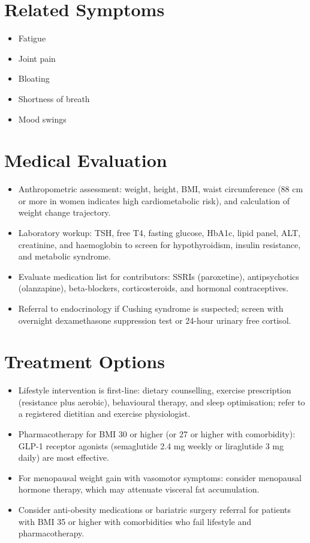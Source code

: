 \section*{Related Symptoms}
\begin{itemize}
  \item Fatigue
  \item Joint pain
  \item Bloating
  \item Shortness of breath
  \item Mood swings
\end{itemize}


\section*{Medical Evaluation}
\begin{itemize}
  \item Anthropometric assessment: weight, height, BMI, waist circumference (88 cm or more in women indicates high cardiometabolic risk), and calculation of weight change trajectory.
  \item Laboratory workup: TSH, free T4, fasting glucose, HbA1c, lipid panel, ALT, creatinine, and haemoglobin to screen for hypothyroidism, insulin resistance, and metabolic syndrome.
  \item Evaluate medication list for contributors: SSRIs (paroxetine), antipsychotics (olanzapine), beta-blockers, corticosteroids, and hormonal contraceptives.
  \item Referral to endocrinology if Cushing syndrome is suspected; screen with overnight dexamethasone suppression test or 24-hour urinary free cortisol.
\end{itemize}

\section*{Treatment Options}
\begin{itemize}
  \item Lifestyle intervention is first-line: dietary counselling, exercise prescription (resistance plus aerobic), behavioural therapy, and sleep optimisation; refer to a registered dietitian and exercise physiologist.
  \item Pharmacotherapy for BMI 30 or higher (or 27 or higher with comorbidity): GLP-1 receptor agonists (semaglutide 2.4 mg weekly or liraglutide 3 mg daily) are most effective.
  \item For menopausal weight gain with vasomotor symptoms: consider menopausal hormone therapy, which may attenuate visceral fat accumulation.
  \item Consider anti-obesity medications or bariatric surgery referral for patients with BMI 35 or higher with comorbidities who fail lifestyle and pharmacotherapy.
\end{itemize}

